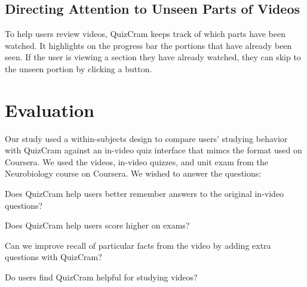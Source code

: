 \documentclass{sigchi}
\begin{document}
\subsection{Directing Attention to Unseen Parts of Videos}

To help users review videos, QuizCram keeps track of which parts have been watched. It highlights on the progress bar the portions that have already been seen. If the user is viewing a section they have already watched, they can skip to the unseen portion by clicking a button. %


\section{Evaluation}
Our study used a within-subjects design to compare users' studying behavior with QuizCram against an in-video quiz interface that mimcs the format used on Coursera. We used the videos, in-video quizzes, and unit exam from the Neurobiology course on Coursera. We wished to answer the questions:

\begin{compactitem}
\item Does QuizCram help users better remember answers to the original in-video questions?
\item Does QuizCram help users score higher on exams?
\item Can we improve recall of particular facts from the video by adding extra questions with QuizCram?
\item Do users find QuizCram helpful for studying videos?
\end{compactitem}
\end{document}
